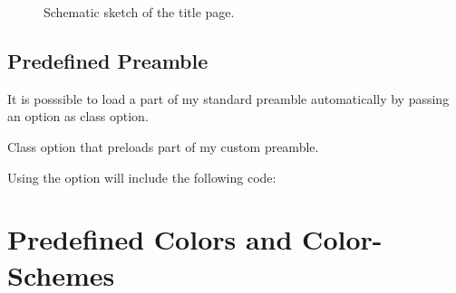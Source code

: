 \documentclass[load-preamble]{cnltx-doc}
\begin{document}
\begin{figure}[htb]
  \centering
  \caption{Schematic sketch of the title page.}
  \label{fig:titlepage}
\end{figure}

\subsection{Predefined Preamble}\label{sec:preamble}

It is posssible to load a part of my standard preamble automatically by
passing an option as class option.
\begin{options}
    Class option that preloads part of my custom preamble.
\end{options}

Using the option will include the following code:

\begin{sourcecode}
  \RequirePackage[oldstyle]{libertine}
  \RequirePackage{libertinehologopatch}%
  \RequirePackage[supstfm=libertinesups]{superiors}
  \RequirePackage{microtype}
  \RequirePackage[scaled=.83]{beramono}
  \RequirePackage{fnpct}
  \RequirePackage[english]{babel}
  \renewcommand*\othersectionlevelsformat[3]{%
    \textcolor{cnltxample}{#3\autodot}\enskip}
  \renewcommand*\partformat{%
    \textcolor{cnltxample}{\partname~\thepart\autodot}}
\end{sourcecode}

\section{Predefined Colors and Color-Schemes}\label{sec:colors}


\printindex
\end{document}

